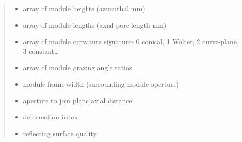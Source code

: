 \documentclass[letterpaper,10pt,english]{sphinxmanual}
\begin{document}
\begin{fulllineitems}
\begin{quote}
\begin{description}
\begin{itemize}
\item {} 
 \textendash{} array of module heights (azimuthal mm)

\item {} 
 \textendash{} array of module lengths (axial pore length mm)

\item {} 
 \textendash{} array of module curvature signatures
0 conical, 1 Wolter, 2 curve-plane, 3 constant…

\item {} 
 \textendash{} array of module grazing angle ratios

\item {} 
 \textendash{} module frame width (surrounding module aperture)

\item {} 
 \textendash{} aperture to join plane axial distance

\item {} 
 \textendash{} deformation index

\item {} 
 \textendash{} reflecting surface quality

\end{itemize}

\end{description}\end{quote}

\end{fulllineitems}

\end{document}
